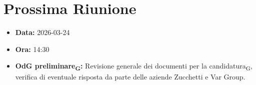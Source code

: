 \section{Prossima Riunione}
\begin{itemize}
	\item \textbf{Data:} {2026-03-24}
	\item \textbf{Ora:} {14:30}
	\item \textbf{OdG preliminare\textsubscript{G}:} Revisione generale dei documenti per la candidatura\textsubscript{G}, verifica di eventuale risposta da parte delle aziende Zucchetti e Var Group.
\end{itemize}